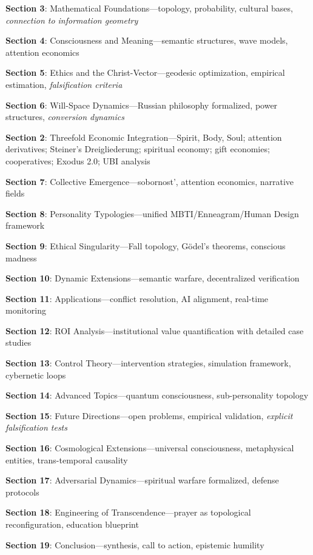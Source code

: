 \documentclass[11pt,a4paper]{article}
\theoremstyle{definition}
\theoremstyle{remark}
\begin{document}
\textbf{Section 3}: Mathematical Foundations—topology, probability, cultural bases, \textit{connection to information geometry}

\textbf{Section 4}: Consciousness and Meaning—semantic structures, wave models, attention economics

\textbf{Section 5}: Ethics and the Christ-Vector—geodesic optimization, empirical estimation, \textit{falsification criteria}

\textbf{Section 6}: Will-Space Dynamics—Russian philosophy formalized, power structures, \textit{conversion dynamics}

\textbf{Section 2}: Threefold Economic Integration—Spirit, Body, Soul; attention derivatives; Steiner's Dreigliederung; spiritual economy; gift economies; cooperatives; Exodus 2.0; UBI analysis

\textbf{Section 7}: Collective Emergence—sobornost', attention economics, narrative fields

\textbf{Section 8}: Personality Typologies—unified MBTI/Enneagram/Human Design framework

\textbf{Section 9}: Ethical Singularity—Fall topology, Gödel's theorems, conscious madness

\textbf{Section 10}: Dynamic Extensions—semantic warfare, decentralized verification

\textbf{Section 11}: Applications—conflict resolution, AI alignment, real-time monitoring

\textbf{Section 12}: ROI Analysis—institutional value quantification with detailed case studies

\textbf{Section 13}: Control Theory—intervention strategies, simulation framework, cybernetic loops

\textbf{Section 14}: Advanced Topics—quantum consciousness, sub-personality topology

\textbf{Section 15}: Future Directions—open problems, empirical validation, \textit{explicit falsification tests}

\textbf{Section 16}: Cosmological Extensions—universal consciousness, metaphysical entities, trans-temporal causality

\textbf{Section 17}: Adversarial Dynamics—spiritual warfare formalized, defense protocols

\textbf{Section 18}: Engineering of Transcendence—prayer as topological reconfiguration, education blueprint

\textbf{Section 19}: Conclusion—synthesis, call to action, epistemic humility
\end{document}
